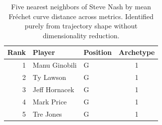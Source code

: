 \begin{table}[htbp]
  \centering\small
  \begin{tabular}{rllc}
    \toprule
    Rank & Player & Position & Archetype \\
    \midrule
    1 & Manu Ginobili & G & 1 \\
    2 & Ty Lawson & G & 1 \\
    3 & Jeff Hornacek & G & 1 \\
    4 & Mark Price & G & 1 \\
    5 & Tre Jones & G & 1 \\
    \bottomrule
  \end{tabular}
  \caption{Five nearest neighbors of Steve Nash by mean Fr\'{e}chet curve distance across metrics. Identified purely from trajectory shape without dimensionality reduction.}
  \label{tab:Steve_Nash_frechet_curve_neighbors}
\end{table}

